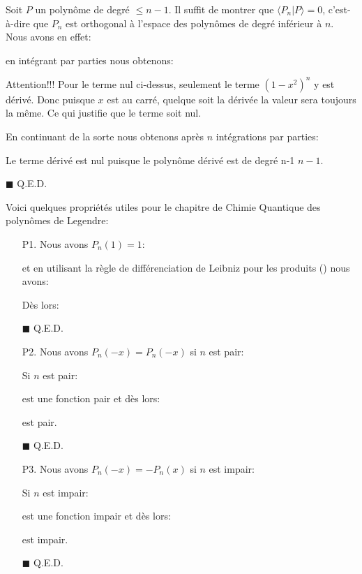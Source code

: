 	\begin{dem}
	Soit $P$ un polynôme de degré $\leq n-1$. Il suffit de montrer que $\langle P_n | P \rangle =0$, c'est-à-dire que $P_n$ est orthogonal à l'espace des polynômes de degré inférieur à $n$. Nous avons en effet:
	
	en intégrant par parties nous obtenons:
	
	
	\begin{tcolorbox}[colback=red!5,borderline={1mm}{2mm}{red!5},arc=0mm,boxrule=0pt]
	\bcbombe Attention!!! Pour le terme nul ci-dessus, seulement le terme $(1-x^2)^n$ y est dérivé. Donc puisque $x$ est au carré, quelque soit la dérivée la valeur sera toujours la même. Ce qui justifie que le terme soit nul.
	\end{tcolorbox}
	
	En continuant de la sorte nous obtenons après $n$ intégrations par parties:
	
	\begin{tcolorbox}[title=Remarque,colframe=black,arc=10pt]
	Le terme dérivé est nul puisque le polynôme dérivé est de degré n-1 $n-1$.
	\end{tcolorbox}
	\begin{flushright}
		$\blacksquare$  Q.E.D.
	\end{flushright}
	\end{dem}	
	Voici quelques propriétés utiles pour le chapitre de Chimie Quantique des polynômes de Legendre:
	\begin{enumerate}
		\item[P1.] Nous avons $P_n(1)=1$:
		\begin{dem}
		
		et en utilisant la règle de différenciation de Leibniz pour les produits () nous avons:
		
		Dès lors:
		
		\begin{flushright}
			$\blacksquare$  Q.E.D.
		\end{flushright}
		\end{dem}

		\item[P2.] Nous avons $P_n(-x)=P_n(-x)$ si $n$ est pair:
		\begin{dem}
		Si $n$ est pair:
		
		est une fonction pair et dès lors:
		
		est pair.
		\begin{flushright}
			$\blacksquare$  Q.E.D.
		\end{flushright}
		\end{dem}

		\item[P3.] Nous avons $P_n(-x)=-P_n(x)$ si $n$ est impair:
		\begin{dem}
		Si $n$ est impair:
		
		est une fonction impair et dès lors:
		
		est impair.
		\begin{flushright}
			$\blacksquare$  Q.E.D.
		\end{flushright}
		\end{dem}
	\end{enumerate}
